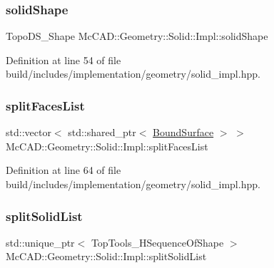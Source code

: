 \subsubsection{\texorpdfstring{solid\+Shape}{solidShape}}
{\footnotesize\ttfamily Topo\+D\+S\+\_\+\+Shape Mc\+C\+A\+D\+::\+Geometry\+::\+Solid\+::\+Impl\+::solid\+Shape}



Definition at line 54 of file build/includes/implementation/geometry/solid\+\_\+impl.\+hpp.

\mbox{\label{classMcCAD_1_1Geometry_1_1Solid_1_1Impl_a642e79e9fa8db428b1c731c100c53517}} 
\subsubsection{\texorpdfstring{split\+Faces\+List}{splitFacesList}}
{\footnotesize\ttfamily std\+::vector$<$ std\+::shared\+\_\+ptr$<$ \hyperlink{classMcCAD_1_1Geometry_1_1BoundSurface}{Bound\+Surface} $>$ $>$ Mc\+C\+A\+D\+::\+Geometry\+::\+Solid\+::\+Impl\+::split\+Faces\+List}



Definition at line 64 of file build/includes/implementation/geometry/solid\+\_\+impl.\+hpp.

\mbox{\label{classMcCAD_1_1Geometry_1_1Solid_1_1Impl_a962b0107f7c5cda9270fdd4e5e0024a3}} 
\subsubsection{\texorpdfstring{split\+Solid\+List}{splitSolidList}}
{\footnotesize\ttfamily std\+::unique\+\_\+ptr$<$ Top\+Tools\+\_\+\+H\+Sequence\+Of\+Shape $>$ Mc\+C\+A\+D\+::\+Geometry\+::\+Solid\+::\+Impl\+::split\+Solid\+List}



